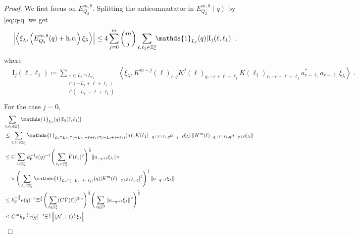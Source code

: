 \documentclass[12pt,a4paper]{article}
\numberwithin{equation}{section}
\newcommand{\1}{\mathbb{I}}
\newcommand{\F}{\mathrm{F}}
\newcommand{\I}{\mathrm{I}}
\newcommand{\Z}{\mathbb{Z}}
\newcommand{\NN}{\mathcal{N}}
\newcommand{\half}{\frac{1}{2}}
\newcommand{\eva}[1]{\left\langle #1 \right\rangle}
\theoremstyle{plain}
\theoremstyle{definition}
\theoremstyle{remark}
\theoremstyle{plain}
\theoremstyle{definition}
\theoremstyle{remark}
\begin{document}
\begin{proof}
We first focus on $ E^{m,8}_{Q_2} $.
Splitting the anticommutator in $ E^{m,8}_{Q_2}(q) $ by \eqref{eq:q-q} we get
\begin{equation} \label{eq:EQ2181}
\begin{aligned}
	& \abs{\eva{\xi_\lambda,\left(E^{m,8}_{Q_2}(q) + \mathrm{h.c.}\right) \xi_\lambda }}
	\le 4 \sum_{j=0}^m {{m}\choose j} \sum_{\ell,\ell_1 \in \Z^3_*}\!\! \mathds{1}_{L_\ell}(q) |\I_j(\ell, \ell_1)| \;,
	\end{aligned}
\end{equation}
where
\begin{equation}
\begin{aligned}
	& \I_j(\ell, \ell_1)
	\coloneq \sum_{\substack{r\in L_{\ell} \cap L_{\ell_1}\\\cap (-L_{\ell}+\ell+\ell_1) \\ \cap (-L_{\ell_1}+\ell+\ell_1)}}
		\eva{\xi_\lambda, K^{m-j}(\ell)_{r,q} K^{j}(\ell)_{q,-r+\ell+\ell_1} K(\ell_1)_{r,-r+\ell+\ell_1} a^*_{r-\ell_1} a_{r-\ell_1} \xi_\lambda} \;. \\
\end{aligned}
\end{equation}
For the case $ j = 0 $,
\begin{align}
	&\sum_{\ell,\ell_1 \in \Z^3_*} \mathds{1}_{L_\ell}(q) |\I_0(\ell, \ell_1)| \nonumber\\
	&\leq \sum_{\ell,\ell_1 \in \Z^3_*} \mathds{1}_{L_\ell \cap L_{\ell_1} \cap (-L_{\ell_1} + \ell + \ell_1) \cap (-L_\ell + \ell + \ell_1)}(q)
		\norm{ K(\ell_1)_{-q+\ell+\ell_1,q} a_{-q+\ell} \xi_\lambda}
		\norm{ K^m(\ell)_{-q+\ell+\ell_1,q} a_{-q+\ell} \xi_\lambda } \nonumber\\
	&\leq C \sum_{\ell \in \Z^3_*} k_{\F}^{-1} e(q)^{-1}
		\Bigg( \sum_{\ell_1 \in \Z^3_*} \hat{V}(\ell_1)^2 \Bigg)^{\half}
		\norm{ a_{-q+\ell} \xi_\lambda} \times \nonumber\\
	&\quad \times \Bigg( \sum_{\ell_1 \in \Z^3_*} \mathds{1}_{L_\ell \cap (-L_\ell + \ell + \ell_1)}(q) |K^m(\ell)_{-q+\ell+\ell_1,q}|^2 \Bigg)^{\half}
		\norm{ a_{-q+\ell} \xi_\lambda } \nonumber\\
	&\leq k_{\F}^{-\frac 32} e(q)^{-1} \Xi^\half
		\Bigg( \sum_{\ell \in \Z^3_*} (C \hat{V}(\ell))^{2m} \Bigg)^{\half}
		\Bigg( \sum_{\ell \in \Z^3} \norm{a_{-q+\ell} \xi_\lambda }^2 \Bigg)^{\half} \nonumber\\
	&\leq C^m k_{\F}^{-\frac 32} e(q)^{-1} \Xi^{\half} \norm{(\NN+1)^{\half} \xi_\lambda} \;. \label{eq:estEQ2181}

\end{align}
\end{proof}
\end{document}

